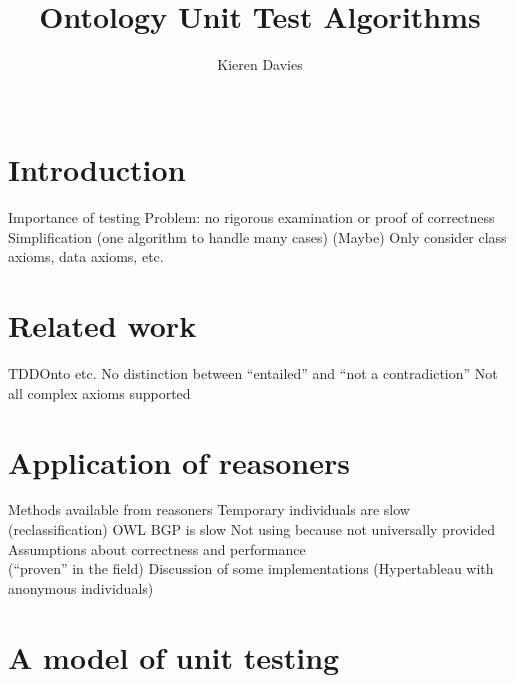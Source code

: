 \documentclass[draft]{sig-alternate}
\let\oldtextproc\textproc
\renewcommand{\textproc}[1]{\nohyphens{\oldtextproc{#1}}}
\begin{document}
\title{Ontology Unit Test Algorithms}
\author{
  \alignauthor
  Kieren Davies\\
   \\
}
\maketitle

\begin{abstract}
\end{abstract}

\section{Introduction}

\begin{todos}
  \todo Importance of testing
  \todo Problem: no rigorous examination or proof of correctness
  \todo Simplification (one algorithm to handle many cases)
  \todo (Maybe) Only consider class axioms, data axioms, etc.
\end{todos}

\section{Related work}

\begin{todos}
  \todo TDDOnto etc.
  \todo No distinction between ``entailed'' and ``not a contradiction''
  \todo Not all complex axioms supported
\end{todos}

\section{Application of reasoners}

\begin{todos}
  \todo Methods available from reasoners
  \todo Temporary individuals are slow (reclassification)
  \todo OWL BGP is slow
  \todo Not using  because not universally provided
  \todo Assumptions about correctness and performance \\(``proven'' in the field)
  \todo Discussion of some implementations (Hypertableau with anonymous individuals)

\end{todos}

\section{A model of unit testing}
\end{document}
